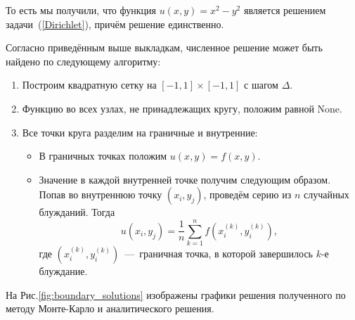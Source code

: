 То есть мы получили, что функция \( u(x,y)=x^2-y^2 \) является решением 
 задачи~(\ref{Dirichlet}), причём решение единственно.

Согласно приведённым выше выкладкам, численное решение может быть найдено 
 по следующему алгоритму:

\begin{enumerate}
	\item Построим квадратную сетку на \( [-1,1]\times[-1,1] \) с шагом 
     \( \Delta \).
	
	\item Функцию во всех узлах, не принадлежащих кругу, положим равной 
     None.
	
	\item Все точки круга разделим на граничные и внутренние:
	
	\begin{itemize}
		\item В граничных точках положим \( u(x,y)=f(x,y) \).
		
		\item Значение в каждой внутренней точке получим следующим образом. 
         Попав во внутреннюю точку \( (x_i,y_j) \), проведём серию из 
         \( n \) случайных блужданий. Тогда
		\[
		u(x_i,y_j) = \dfrac{1}{n} \sum\limits_{k = 1}^{n} f \left( x_i^{(k)}, 
         y_i^{(k)} \right), 
		\]
		где \( \left( x_i^{(k)}, y_i^{(k)} \right) \)~---~граничная точка, в 
         которой завершилось \( k \)-е блуждание.
	\end{itemize}
\end{enumerate}

На Рис.\eqref{fig:boundary_solutions} изображены графики решения полученного по методу Монте-Карло
 и аналитического решения.

